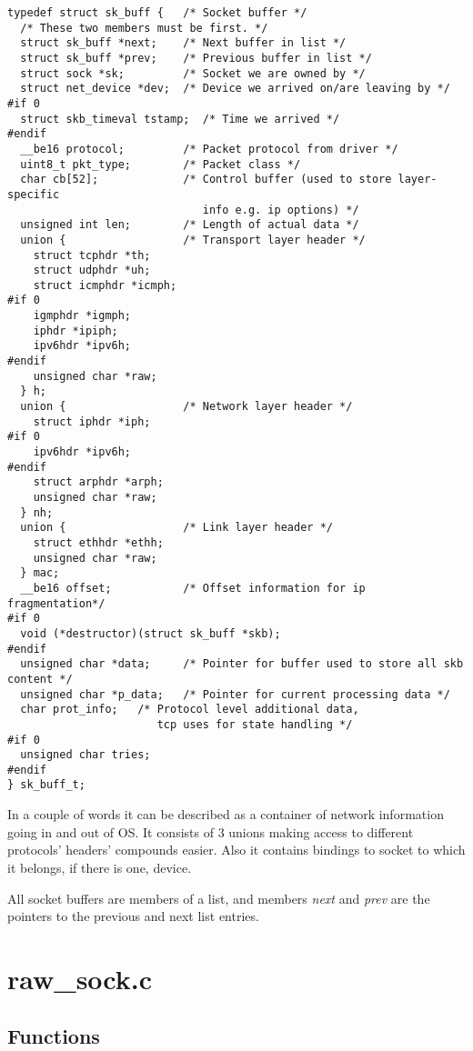 \documentclass[12pt,a4paper]{article}
\begin{document}
\begin{verbatim}
typedef struct sk_buff {   /* Socket buffer */
  /* These two members must be first. */
  struct sk_buff *next;    /* Next buffer in list */
  struct sk_buff *prev;    /* Previous buffer in list */
  struct sock *sk;         /* Socket we are owned by */
  struct net_device *dev;  /* Device we arrived on/are leaving by */
#if 0
  struct skb_timeval tstamp;  /* Time we arrived */
#endif
  __be16 protocol;         /* Packet protocol from driver */
  uint8_t pkt_type;        /* Packet class */
  char cb[52];             /* Control buffer (used to store layer-specific 
                              info e.g. ip options) */
  unsigned int len;        /* Length of actual data */
  union {                  /* Transport layer header */
    struct tcphdr *th;
    struct udphdr *uh;
    struct icmphdr *icmph;
#if 0
    igmphdr *igmph;
    iphdr *ipiph;
    ipv6hdr *ipv6h;
#endif
    unsigned char *raw;
  } h;
  union {                  /* Network layer header */
    struct iphdr *iph;
#if 0
    ipv6hdr *ipv6h;
#endif
    struct arphdr *arph;
    unsigned char *raw;
  } nh;
  union {                  /* Link layer header */
    struct ethhdr *ethh;
    unsigned char *raw;
  } mac;
  __be16 offset;           /* Offset information for ip fragmentation*/
#if 0
  void (*destructor)(struct sk_buff *skb);
#endif
  unsigned char *data;     /* Pointer for buffer used to store all skb content */
  unsigned char *p_data;   /* Pointer for current processing data */
  char prot_info;   /* Protocol level additional data, 
                       tcp uses for state handling */
#if 0
  unsigned char tries;
#endif
} sk_buff_t;
\end{verbatim}

In a couple of words it can be described as a container of network information
going in and out of OS. It consists of 3 unions making access to different
protocols' headers' compounds easier. Also it contains bindings to socket to which it
belongs, if there is one, device.

All socket buffers are members of a list, and members {\it next} and {\it prev}
are the pointers to the previous and next list entries.

\newpage
\section{raw\_sock.c}
\label{sec:raw_sock_c}

\subsection{Functions}
\end{document}
